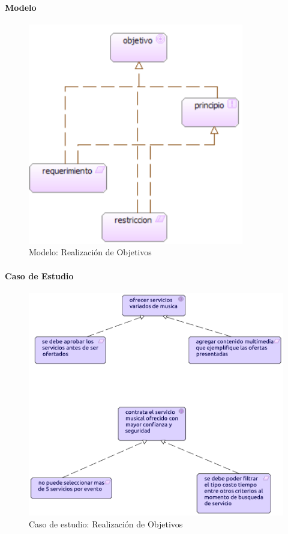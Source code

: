 \paragraph{Modelo}
\begin{figure}[h!]
	\centering
	\includegraphics[width=0.6\linewidth]{Desarrollo/ArquitecturaEmpresarial/Motivacion/imgs/realizacionObjMetamodelo.PNG}
	\caption{Modelo: Realización de Objetivos}
\end{figure}
\paragraph{Caso de Estudio}

\begin{figure}[h!]
	\centering
	\includegraphics[width=\linewidth]{Desarrollo/ArquitecturaEmpresarial/Motivacion/imgs/realizacionObj.pdf}
	\caption{Caso de estudio: Realización de Objetivos}
	\label{fig:comportamiento}
\end{figure}

